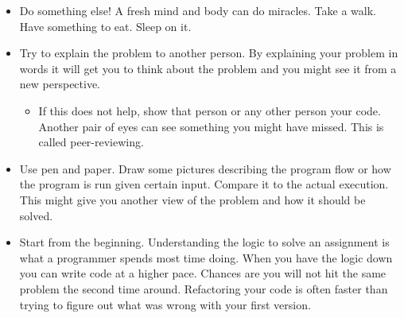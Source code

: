 \documentclass[11pt,a4paper,twoside]{article}
\begin{document}
\begin{itemize} 
    \item Do something else! A fresh mind and body can do miracles. Take a walk.
          Have something to eat. Sleep on it. 
    \item Try to explain the problem to another person. By explaining your 
          problem in words it will get you to think about the problem and you 
          might see it from a new perspective.  
    \begin{itemize}
        \item If this does not help, show that person or any other person
              your code. Another pair of eyes can see something you might have 
              missed. This is called peer-reviewing.
    \end{itemize}
    \item Use pen and paper. Draw some pictures describing the program flow or 
          how the program is run given certain input. Compare it to the actual
          execution. This might give you another view of the problem and how it 
          should be solved.
    \item Start from the beginning. Understanding the logic to solve an 
          assignment is what a programmer spends most time doing. When you have
          the logic down you can write code at a higher pace. Chances are you
          will not hit the same problem the second time around. Refactoring your
          code is often faster than trying to figure out what was wrong with 
          your first version.
\end{itemize}
\end{document}
